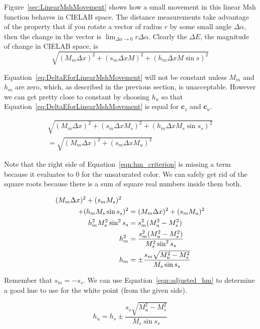 \documentclass{acmsiggraph}               %
\newcommand{\Lab}{CIELAB\xspace}
\newcommand{\Msh}{Msh\xspace}
\newcommand{\DeltaE}{\ensuremath{\Delta{}E}\xspace}
\newcommand*{\cvec}[1]{\mathbf{#1}}
\begin{document}
Figure~\ref{sec:LinearMshMovement} shows how a small movement in this
linear \Msh function behaves in \Lab space.  The distance measurements take
advantage of the property that if you rotate a vector of radius $r$ by some
small angle $\Delta\alpha$, then the change in the vector is
$\lim_{\Delta\alpha \rightarrow 0}r \Delta\alpha$.  Clearly the \DeltaE,
the magnitude of change in \Lab space, is
\begin{equation}
  \sqrt{(M_m \Delta x)^2 + (s_m \Delta x M)^2 + (h_m \Delta x M \sin s)^2}
  \label{eq:DeltaEforLinearMshMovement}
\end{equation}

Equation~\ref{eq:DeltaEforLinearMshMovement} will not be constant unless
$M_m$ and $h_m$ are zero, which, as described in the previous section, is
unacceptable.  However we can get pretty close to constant by choosing
$h_u$ so that Equation~\ref{eq:DeltaEforLinearMshMovement} is equal for
$\cvec{c}_s$ and $\cvec{c}_u$.

\begin{multline}
  \sqrt{(M_m \Delta x)^2 + (s_m \Delta x M_s)^2 + (h_m \Delta x M_s \sin s_s)^2}
  \\ =
  \sqrt{(M_m \Delta x)^2 + (s_m \Delta x M_u)^2}
  \label{eqn:hm_criterion}
\end{multline}

Note that the right side of Equation~\ref{eqn:hm_criterion} is missing a
term because it evaluates to 0 for the unsaturated color.  We can safely
get rid of the square roots because there is a sum of square real numbers
inside them both.

\begin{align}
    (M_m \Delta x)^2 + (s_m M_s)^2 \quad & \notag \\
    + (h_m M_s \sin s_s)^2 &= (M_m \Delta x)^2 + (s_m M_u)^2 \notag \\
    h_m^2 M_s^2 \sin^2 s_s &= s_m^2 (M_u^2 - M_s^2) \notag \\
    h_m^2 &= \frac{s_m^2 (M_u^2 - M_s^2)}{M_s^2 \sin^2 s_s} \notag \\
    h_m &= \pm \frac{s_m \sqrt{M_u^2 - M_s^2}}{M_s \sin s_s}
    \label{eqn:adjusted_hm}
\end{align}

Remember that $s_m=-s_s$.  We can use Equation~\ref{eqn:adjusted_hm} to
determine a good hue to use for the white point (from the given side).

\begin{equation}
  h_u = h_s \pm \frac{s_s \sqrt{M_u^2 - M_s^2}}{M_s \sin s_s}
  \label{eqn:adjusted_hu}
\end{equation}
\end{document}
